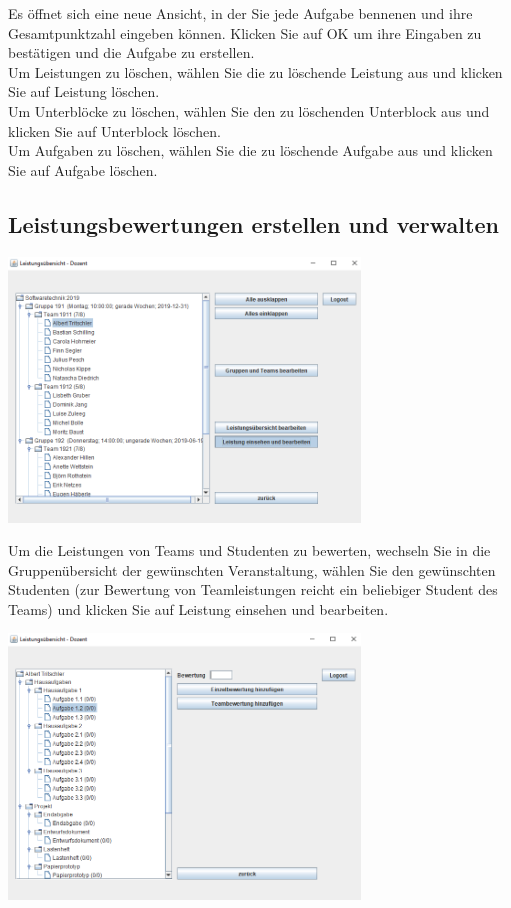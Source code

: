 \documentclass{Handbuch}
\begin{document}
Es öffnet sich eine neue Ansicht, in der Sie jede Aufgabe bennenen und ihre Gesamtpunktzahl eingeben können. Klicken Sie auf \frqq OK\flqq{} um ihre Eingaben zu bestätigen und die Aufgabe zu erstellen.\\
Um Leistungen zu löschen, wählen Sie die zu löschende Leistung aus und klicken Sie auf \frqq Leistung löschen\flqq.\\
Um Unterblöcke zu löschen, wählen Sie den zu löschenden Unterblock aus und klicken Sie auf \frqq Unterblock löschen\flqq.\\
Um Aufgaben zu löschen, wählen Sie die zu löschende Aufgabe aus und klicken Sie auf \frqq Aufgabe löschen\flqq.\\

\subsection{Leistungsbewertungen erstellen und verwalten}
\begin{center}
	\includegraphics[width=0.7\textwidth]{img_DozentenGUI_19.png}
\end{center}
Um die Leistungen von Teams und Studenten zu bewerten, wechseln Sie in die Gruppenübersicht der gewünschten Veranstaltung, wählen Sie den gewünschten Studenten (zur Bewertung von Teamleistungen reicht ein beliebiger Student des Teams) und klicken Sie auf \frqq Leistung einsehen und bearbeiten\flqq. 
\begin{center}
	\includegraphics[width=0.7\textwidth]{img_DozentenGUI_20.png}
\end{center}
\end{document}

